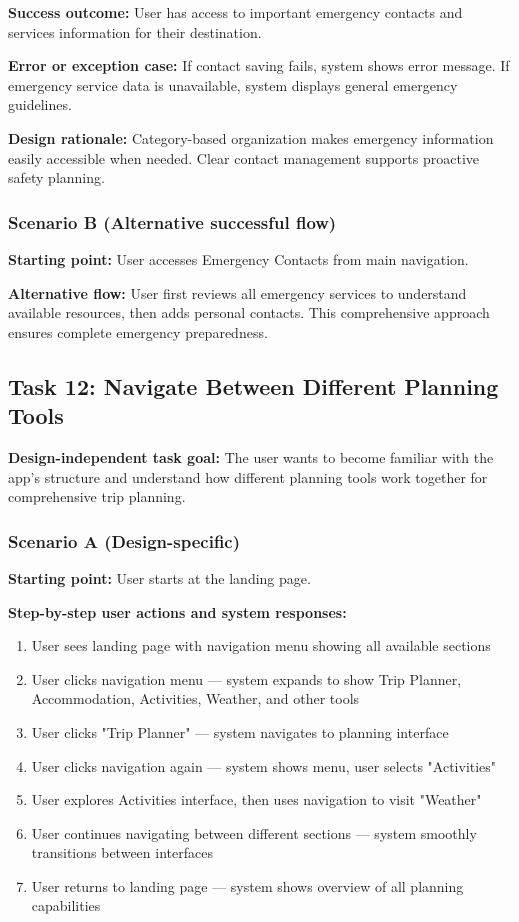 \documentclass[11pt,a4paper]{article}
\begin{document}
\textbf{Success outcome:} User has access to important emergency contacts and services information for their destination.

\textbf{Error or exception case:} If contact saving fails, system shows error message. If emergency service data is unavailable, system displays general emergency guidelines.

\textbf{Design rationale:} Category-based organization makes emergency information easily accessible when needed. Clear contact management supports proactive safety planning.

\subsubsection*{Scenario B (Alternative successful flow)}

\textbf{Starting point:} User accesses Emergency Contacts from main navigation.

\textbf{Alternative flow:} User first reviews all emergency services to understand available resources, then adds personal contacts. This comprehensive approach ensures complete emergency preparedness.

\subsection*{Task 12: Navigate Between Different Planning Tools}

\textbf{Design-independent task goal:}
The user wants to become familiar with the app's structure and understand how different planning tools work together for comprehensive trip planning.

\subsubsection*{Scenario A (Design-specific)}

\textbf{Starting point:} User starts at the landing page.

\textbf{Step-by-step user actions and system responses:}
\begin{enumerate}
\item User sees landing page with navigation menu showing all available sections
\item User clicks navigation menu — system expands to show Trip Planner, Accommodation, Activities, Weather, and other tools
\item User clicks "Trip Planner" — system navigates to planning interface
\item User clicks navigation again — system shows menu, user selects "Activities"
\item User explores Activities interface, then uses navigation to visit "Weather"
\item User continues navigating between different sections — system smoothly transitions between interfaces
\item User returns to landing page — system shows overview of all planning capabilities
\end{enumerate}
\end{document}
